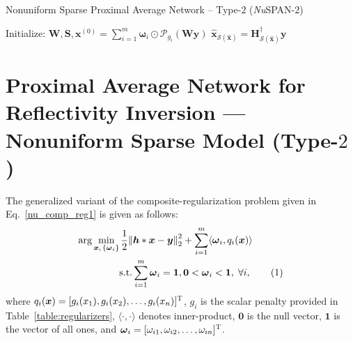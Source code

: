 \documentclass[journal]{IEEEtran}
\newcommand\numberthis{\addtocounter{equation}{1}\tag{\theequation}}
\begin{document}
\begin{algorithm}[t]
    \caption{Nonuniform Sparse Proximal Average Network -- Type-$2$ ({\it Nu}SPAN-$2$)}\label{alg:nuspan2}
    Initialize: $\mathbf{W}, \mathbf{S}, \boldsymbol{x}^{(0)} = \sum\limits_{i = 1}^m \boldsymbol{\omega}_{i} \odot \mathcal{P}_{g_{i}} (\mathbf{W}{\boldsymbol{y}}) $\;
    $\hat{\boldsymbol{x}}_{\mathcal{S}(\hat{\boldsymbol{x}})} = \mathbf{H}_{\mathcal{S}(\hat{\boldsymbol{x}})}^{\dagger}\boldsymbol{y}$\;
\end{algorithm}%

\section{Proximal Average Network for Reflectivity Inversion --- Nonuniform Sparse Model (Type-\texorpdfstring{$2$}{2})}
\label{sec:nu_span2}
The generalized variant of the composite-regularization problem given in Eq.~\eqref{nu_comp_reg1} is given as follows:
\begin{align*}
    \arg\min_{\boldsymbol{x}, \,\{\boldsymbol{\omega}_{i}\}} & \, {\frac{1}{2}{\left\| \boldsymbol{h}*\boldsymbol{x}-\boldsymbol{y} \right\|}_{2}^{2}} + \sum\limits_{i = 1}^m \langle \boldsymbol{\omega}_i, q_i(\boldsymbol{x}) \rangle \\
    & \text{s.t.} \sum\limits_{i=1}^m {\boldsymbol{\omega}_{i}=\boldsymbol{1}}, \boldsymbol{0}<\boldsymbol{\omega}_{i}<\boldsymbol{1}, \; \forall{i}, \numberthis \label{nu_comp_reg2}
\end{align*}%
where $q_i(\boldsymbol{x}) = [g_i(x_1), g_i(x_2), \ldots , g_i(x_n)]^{\textsc{T}}$, $g_i$ is the scalar penalty provided in Table~\ref{table:regularizers}, $\langle \cdot, \cdot \rangle$ denotes inner-product, $\boldsymbol{0}$ is the null vector, $\boldsymbol{1}$ is the vector of all ones, and $\boldsymbol{\omega}_i = [\omega_{i1}, \omega_{i2}, \ldots , \omega_{in}]^{\textsc{T}}$.
\end{document}

